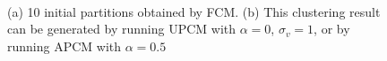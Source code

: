 \documentclass[journal]{IEEEtran}
\theoremstyle{definition}
\begin{document}
\begin{figure}[tb]
\captionsetup[subfloat]{farskip=1pt,captionskip=1pt}%
   \centering
    \\
\caption{(a) 10 initial partitions obtained by FCM. (b) This clustering result can be generated by running UPCM with $\alpha=0$, $\sigma_v=1$, or by running APCM with $\alpha=0.5$ }
\label{fig_background_noise}
\end{figure}
\end{document}
